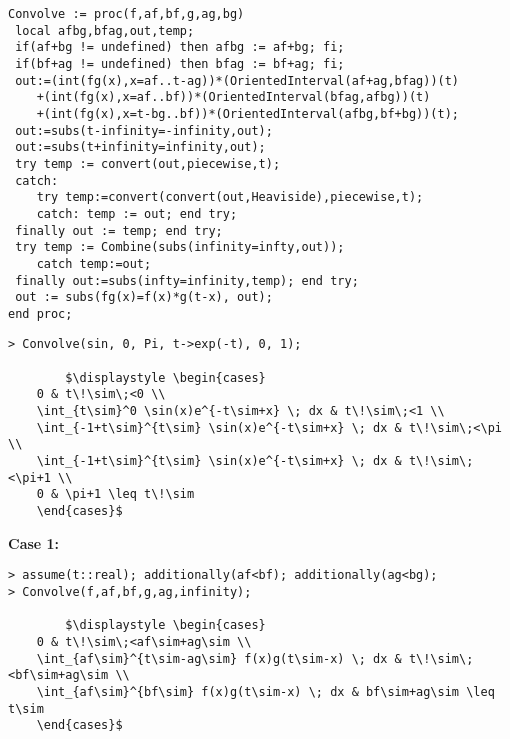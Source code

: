 \begin{lstlisting}[frame=single, mathescape]
Convolve := proc(f,af,bf,g,ag,bg)
 local afbg,bfag,out,temp;
 if(af+bg != undefined) then afbg := af+bg; fi;
 if(bf+ag != undefined) then bfag := bf+ag; fi;
 out:=(int(fg(x),x=af..t-ag))*(OrientedInterval(af+ag,bfag))(t)
    +(int(fg(x),x=af..bf))*(OrientedInterval(bfag,afbg))(t)
    +(int(fg(x),x=t-bg..bf))*(OrientedInterval(afbg,bf+bg))(t);
 out:=subs(t-infinity=-infinity,out);
 out:=subs(t+infinity=infinity,out);
 try temp := convert(out,piecewise,t);
 catch: 
    try temp:=convert(convert(out,Heaviside),piecewise,t);
    catch: temp := out; end try;  
 finally out := temp; end try;
 try temp := Combine(subs(infinity=infty,out));
    catch temp:=out;
 finally out:=subs(infty=infinity,temp); end try;
 out := subs(fg(x)=f(x)*g(t-x), out);
end proc;
\end{lstlisting}


\begin{lstlisting}[frame=single, mathescape]
> Convolve(sin, 0, Pi, t->exp(-t), 0, 1);

		$\displaystyle \begin{cases}
	0 & t\!\sim\;<0 \\
	\int_{t\sim}^0 \sin(x)e^{-t\sim+x} \; dx & t\!\sim\;<1 \\
	\int_{-1+t\sim}^{t\sim} \sin(x)e^{-t\sim+x} \; dx & t\!\sim\;<\pi \\
	\int_{-1+t\sim}^{t\sim} \sin(x)e^{-t\sim+x} \; dx & t\!\sim\;<\pi+1 \\
	0 & \pi+1 \leq t\!\sim
	\end{cases}$
\end{lstlisting}

\textbf{Case 1:}
\begin{lstlisting}[frame=single, mathescape]
> assume(t::real); additionally(af<bf); additionally(ag<bg);
> Convolve(f,af,bf,g,ag,infinity);

		$\displaystyle \begin{cases}
	0 & t\!\sim\;<af\sim+ag\sim \\
	\int_{af\sim}^{t\sim-ag\sim} f(x)g(t\sim-x) \; dx & t\!\sim\;<bf\sim+ag\sim \\
	\int_{af\sim}^{bf\sim} f(x)g(t\sim-x) \; dx & bf\sim+ag\sim \leq t\sim
	\end{cases}$
\end{lstlisting}



